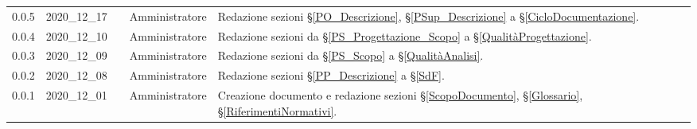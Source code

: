 {\begin{longtable}{ c c  C{2.3cm} C{3cm} C{3.2cm}}
    0.0.5 & 2020\_12\_17 & \TG{} & Amministratore  & Redazione sezioni \S\ref{PO_Descrizione}, \S\ref{PSup_Descrizione} a \S\ref{CicloDocumentazione}. \\
    
     0.0.4 & 2020\_12\_10 & \TG{} & Amministratore  & Redazione sezioni da \S\ref{PS_Progettazione_Scopo} a \S\ref{QualitàProgettazione}. \\
    
     0.0.3 & 2020\_12\_09 & \TG{} & Amministratore  & Redazione sezioni da \S\ref{PS_Scopo} a \S\ref{QualitàAnalisi}.  \\
     
     0.0.2 & 2020\_12\_08 & \TG{} & Amministratore  & Redazione sezioni \S\ref{PP_Descrizione} a \S\ref{SdF}.  \\      
            
    0.0.1 & 2020\_12\_01 & \TG{} & Amministratore  & Creazione documento e redazione sezioni \S\ref{ScopoDocumento}, \S\ref{Glossario}, \S\ref{RiferimentiNormativi}.  \\
			
\end{longtable}
}